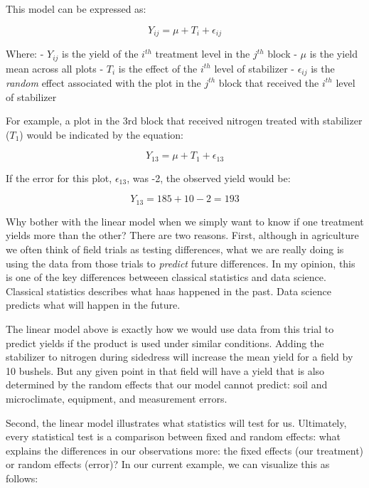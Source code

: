 \documentclass[
]{book}
\begin{document}
This model can be expressed as:

\[ Y_{ij} = \mu + T_i + \epsilon_{ij} \]

Where:
- \(Y_{ij}\) is the yield of the \(i^{th}\) treatment level in the \(j^{th}\) block
- \(\mu\) is the yield mean across all plots
- \(T_i\) is the effect of the \(i^{th}\) level of stabilizer
- \(\epsilon_{ij}\) is the \emph{random} effect associated with the plot in the \(j^{th}\) block that received the \(i^{th}\) level of stabilizer

For example, a plot in the 3rd block that received nitrogen treated with stabilizer (\(T_1\)) would be indicated by the equation:

\[ Y_{13} = \mu + T_1 + \epsilon_{13} \]

If the error for this plot, \(\epsilon_{13}\), was -2, the observed yield would be:

\[ Y_{13} = 185 + 10 -2 = 193 \]

Why bother with the linear model when we simply want to know if one treatment yields more than the other? There are two reasons. First, although in agriculture we often think of field trials as testing differences, what we are really doing is using the data from those trials to \emph{predict} future differences. In my opinion, this is one of the key differences betweeen classical statistics and data science. Classical statistics describes what haas happened in the past. Data science predicts what will happen in the future.

The linear model above is exactly how we would use data from this trial to predict yields if the product is used under similar conditions. Adding the stabilizer to nitrogen during sidedress will increase the mean yield for a field by 10 bushels. But any given point in that field will have a yield that is also determined by the random effects that our model cannot predict: soil and microclimate, equipment, and measurement errors.

Second, the linear model illustrates what statistics will test for us. Ultimately, every statistical test is a comparison between fixed and random effects: what explains the differences in our observations more: the fixed effects (our treatment) or random effects (error)? In our current example, we can visualize this as follows:
\end{document}
